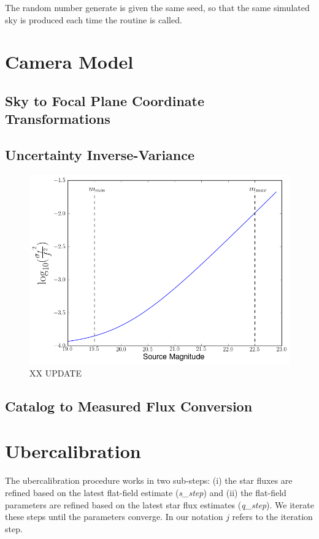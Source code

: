 \documentclass[12pt,a4paper,twoside]{article}
\begin{document}
The random number generate is given the same seed, so that the same simulated sky is produced each time the routine is called.


\section{Camera Model}

\subsection{Sky to Focal Plane Coordinate Transformations}

\subsection{Uncertainty Inverse-Variance}
\begin{figure}[ht]
\begin{center}
\includegraphics[width=\textwidth]{flux_uncertainty_variance.png}
\end{center}
\caption{XX UPDATE \label{fig:flux_uncertainty}}
\end{figure}
\subsection{Catalog to Measured Flux Conversion}

\section{Ubercalibration}
The ubercalibration procedure works in two sub-steps: (i) the star fluxes are refined based on the latest flat-field estimate (\textit{s\_step}) and (ii) the flat-field parameters are refined based on the latest star flux estimates (\textit{q\_step}). We iterate these steps until the parameters converge. In our notation $j$ refers to the iteration step. 
\end{document}

